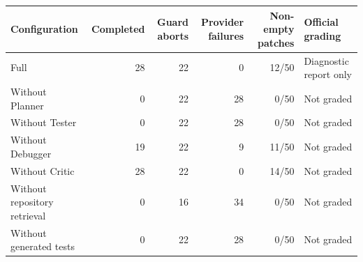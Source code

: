 \begin{tabular}{lrrrrl}
\toprule
Configuration & Completed & Guard aborts & Provider failures & Non-empty patches & Official grading \\
\midrule
Full \agentforge{} & 28 & 22 & 0 & 12/50 & Diagnostic report only \\
Without Planner & 0 & 22 & 28 & 0/50 & Not graded \\
Without Tester & 0 & 22 & 28 & 0/50 & Not graded \\
Without Debugger & 19 & 22 & 9 & 11/50 & Not graded \\
Without Critic & 28 & 22 & 0 & 14/50 & Not graded \\
Without repository retrieval & 0 & 16 & 34 & 0/50 & Not graded \\
Without generated tests & 0 & 22 & 28 & 0/50 & Not graded \\
\bottomrule
\end{tabular}
